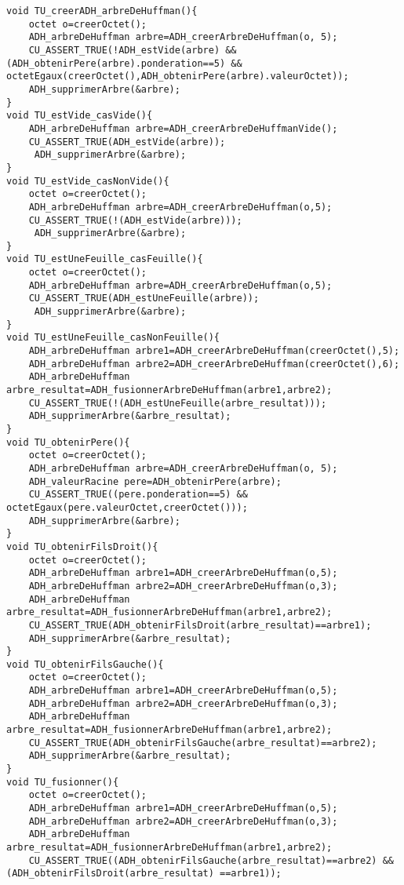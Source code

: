 \begin{verbatim}
void TU_creerADH_arbreDeHuffman(){
    octet o=creerOctet();
    ADH_arbreDeHuffman arbre=ADH_creerArbreDeHuffman(o, 5);
    CU_ASSERT_TRUE(!ADH_estVide(arbre) && (ADH_obtenirPere(arbre).ponderation==5) && octetEgaux(creerOctet(),ADH_obtenirPere(arbre).valeurOctet));
	ADH_supprimerArbre(&arbre);
}
void TU_estVide_casVide(){
    ADH_arbreDeHuffman arbre=ADH_creerArbreDeHuffmanVide();
    CU_ASSERT_TRUE(ADH_estVide(arbre));
     ADH_supprimerArbre(&arbre);
}
void TU_estVide_casNonVide(){
    octet o=creerOctet();
    ADH_arbreDeHuffman arbre=ADH_creerArbreDeHuffman(o,5);
    CU_ASSERT_TRUE(!(ADH_estVide(arbre)));
     ADH_supprimerArbre(&arbre);
}
void TU_estUneFeuille_casFeuille(){
    octet o=creerOctet();
    ADH_arbreDeHuffman arbre=ADH_creerArbreDeHuffman(o,5);
    CU_ASSERT_TRUE(ADH_estUneFeuille(arbre));
     ADH_supprimerArbre(&arbre);
}
void TU_estUneFeuille_casNonFeuille(){
    ADH_arbreDeHuffman arbre1=ADH_creerArbreDeHuffman(creerOctet(),5);
    ADH_arbreDeHuffman arbre2=ADH_creerArbreDeHuffman(creerOctet(),6);
    ADH_arbreDeHuffman arbre_resultat=ADH_fusionnerArbreDeHuffman(arbre1,arbre2);
    CU_ASSERT_TRUE(!(ADH_estUneFeuille(arbre_resultat)));
	ADH_supprimerArbre(&arbre_resultat);
}
void TU_obtenirPere(){
    octet o=creerOctet();
    ADH_arbreDeHuffman arbre=ADH_creerArbreDeHuffman(o, 5);
    ADH_valeurRacine pere=ADH_obtenirPere(arbre);
    CU_ASSERT_TRUE((pere.ponderation==5) && octetEgaux(pere.valeurOctet,creerOctet()));
    ADH_supprimerArbre(&arbre);
}
void TU_obtenirFilsDroit(){
    octet o=creerOctet();
    ADH_arbreDeHuffman arbre1=ADH_creerArbreDeHuffman(o,5);
    ADH_arbreDeHuffman arbre2=ADH_creerArbreDeHuffman(o,3);
    ADH_arbreDeHuffman arbre_resultat=ADH_fusionnerArbreDeHuffman(arbre1,arbre2);
    CU_ASSERT_TRUE(ADH_obtenirFilsDroit(arbre_resultat)==arbre1);
	ADH_supprimerArbre(&arbre_resultat);
}
void TU_obtenirFilsGauche(){
    octet o=creerOctet();
    ADH_arbreDeHuffman arbre1=ADH_creerArbreDeHuffman(o,5);
    ADH_arbreDeHuffman arbre2=ADH_creerArbreDeHuffman(o,3);
    ADH_arbreDeHuffman arbre_resultat=ADH_fusionnerArbreDeHuffman(arbre1,arbre2);
    CU_ASSERT_TRUE(ADH_obtenirFilsGauche(arbre_resultat)==arbre2);
	ADH_supprimerArbre(&arbre_resultat);
}
void TU_fusionner(){
    octet o=creerOctet();
    ADH_arbreDeHuffman arbre1=ADH_creerArbreDeHuffman(o,5);
    ADH_arbreDeHuffman arbre2=ADH_creerArbreDeHuffman(o,3);
    ADH_arbreDeHuffman arbre_resultat=ADH_fusionnerArbreDeHuffman(arbre1,arbre2);
    CU_ASSERT_TRUE((ADH_obtenirFilsGauche(arbre_resultat)==arbre2) && (ADH_obtenirFilsDroit(arbre_resultat) ==arbre1));

\end{verbatim}
